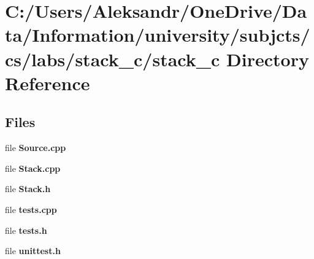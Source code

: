 \section{C\+:/\+Users/\+Aleksandr/\+One\+Drive/\+Data/\+Information/university/subjcts/cs/labs/stack\+\_\+c/stack\+\_\+c Directory Reference}
\label{dir_9d12caf87669782deb04da08c75b438b}
\subsection*{Files}
\begin{DoxyCompactItemize}
\item 
file \textbf{ Source.\+cpp}
\item 
file \textbf{ Stack.\+cpp}
\item 
file \textbf{ Stack.\+h}
\item 
file \textbf{ tests.\+cpp}
\item 
file \textbf{ tests.\+h}
\item 
file \textbf{ unittest.\+h}
\end{DoxyCompactItemize}
